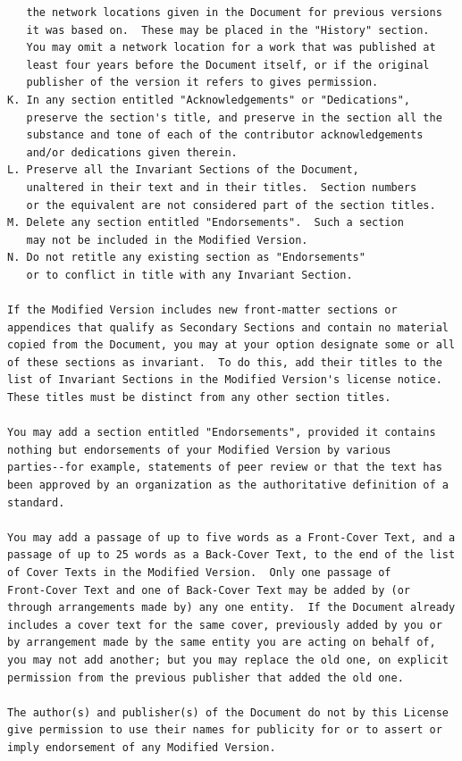 \documentclass[12pt]{report}
\begin{document}
\begin{verbatim}
   the network locations given in the Document for previous versions
   it was based on.  These may be placed in the "History" section.
   You may omit a network location for a work that was published at
   least four years before the Document itself, or if the original
   publisher of the version it refers to gives permission.
K. In any section entitled "Acknowledgements" or "Dedications",
   preserve the section's title, and preserve in the section all the
   substance and tone of each of the contributor acknowledgements
   and/or dedications given therein.
L. Preserve all the Invariant Sections of the Document,
   unaltered in their text and in their titles.  Section numbers
   or the equivalent are not considered part of the section titles.
M. Delete any section entitled "Endorsements".  Such a section
   may not be included in the Modified Version.
N. Do not retitle any existing section as "Endorsements"
   or to conflict in title with any Invariant Section.

If the Modified Version includes new front-matter sections or
appendices that qualify as Secondary Sections and contain no material
copied from the Document, you may at your option designate some or all
of these sections as invariant.  To do this, add their titles to the
list of Invariant Sections in the Modified Version's license notice.
These titles must be distinct from any other section titles.

You may add a section entitled "Endorsements", provided it contains
nothing but endorsements of your Modified Version by various
parties--for example, statements of peer review or that the text has
been approved by an organization as the authoritative definition of a
standard.

You may add a passage of up to five words as a Front-Cover Text, and a
passage of up to 25 words as a Back-Cover Text, to the end of the list
of Cover Texts in the Modified Version.  Only one passage of
Front-Cover Text and one of Back-Cover Text may be added by (or
through arrangements made by) any one entity.  If the Document already
includes a cover text for the same cover, previously added by you or
by arrangement made by the same entity you are acting on behalf of,
you may not add another; but you may replace the old one, on explicit
permission from the previous publisher that added the old one.

The author(s) and publisher(s) of the Document do not by this License
give permission to use their names for publicity for or to assert or
imply endorsement of any Modified Version.



\end{verbatim}
\end{document}
